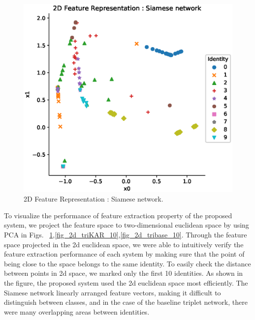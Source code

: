 \begin{figure}[!ht]
    \includegraphics[width=\textwidth]{fig_2d_siam_10_v1.eps}
    \caption{2D Feature Representation : Siamese network.} \label{fig_2d_siam_10}
\end{figure}
To visualize the performance of feature extraction property of the proposed system, we project the feature space to two-dimensional euclidean space by using PCA in Figs. ~\ref{fig_2d_siam_10},\ref{fig_2d_triKAR_10},\ref{fig_2d_tribase_10}. Through the feature space projected in the 2d euclidean space, we were able to intuitively verify the feature extraction performance of each system by making sure that the point of being close to the space belongs to the same identity. To easily check the distance between points in 2d space, we marked only the first 10 identities.
As shown in the figure, the proposed system used the 2d euclidean space most efficiently. The Siamese network linearly arranged feature vectors, making it difficult to distinguish between classes, and in the case of the baseline triplet network, there were many overlapping areas between identities.